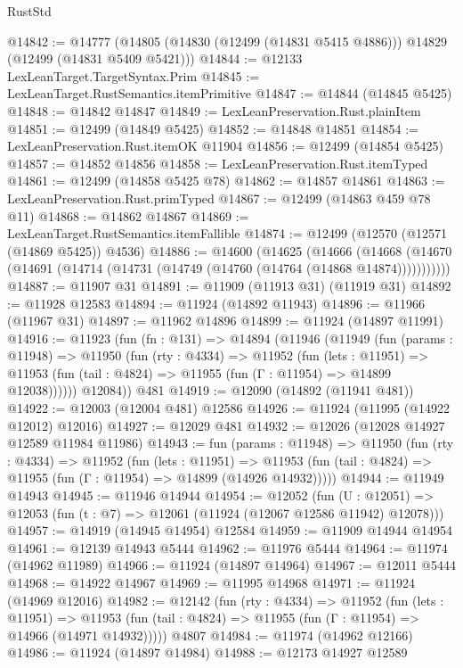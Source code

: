 \begin{lexlean}{RustStd}
\begin{coremodule}
{\begin{coremodule}
{{{{{{{{{{{{{{{{{{{{{{{{{{{{{{{{{{{{{{{{{{{{{{{{{{{{{{{{{{{{{{{{{{{{{{{{{{{{{{{{@14842 := @14777
    (@14805 (@14830 (@12499 (@14831 @5415 @4886))) @14829 (@12499 (@14831 @5409 @5421)))
@14844 := @12133 LexLeanTarget.TargetSyntax.Prim
@14845 := LexLeanTarget.RustSemantics.itemPrimitive
@14847 := @14844 (@14845 @5425)
@14848 := @14842 @14847
@14849 := LexLeanPreservation.Rust.plainItem
@14851 := @12499 (@14849 @5425)
@14852 := @14848 @14851
@14854 := LexLeanPreservation.Rust.itemOK @11904
@14856 := @12499 (@14854 @5425)
@14857 := @14852 @14856
@14858 := LexLeanPreservation.Rust.itemTyped
@14861 := @12499 (@14858 @5425 @78)
@14862 := @14857 @14861
@14863 := LexLeanPreservation.Rust.primTyped
@14867 := @12499 (@14863 @459 @78 @11)
@14868 := @14862 @14867
@14869 := LexLeanTarget.RustSemantics.itemFallible
@14874 := @12499 (@12570 (@12571 (@14869 @5425)) @4536)
@14886 := @14600
    (@14625
      (@14666
        (@14668 (@14670 (@14691 (@14714 (@14731 (@14749 (@14760 (@14764 (@14868 @14874)))))))))))
@14887 := @11907 @31
@14891 := @11909 (@11913 @31) (@11919 @31)
@14892 := @11928 @12583
@14894 := @11924 (@14892 @11943)
@14896 := @11966 (@11967 @31)
@14897 := @11962 @14896
@14899 := @11924 (@14897 @11991)
@14916 := @11923
    (fun (fn : @131) =>
    @14894
      (@11946
        (@11949
          (fun (params : @11948) =>
          @11950
            (fun (rty : @4334) =>
            @11952
              (fun (lets : @11951) =>
              @11953 (fun (tail : @4824) => @11955 (fun (Γ : @11954) => @14899 @12038))))))
        @12084))
    @481
@14919 := @12090 (@14892 (@11941 @481))
@14922 := @12003 (@12004 @481) @12586
@14926 := @11924 (@11995 (@14922 @12012) @12016)
@14927 := @12029 @481
@14932 := @12026 (@12028 @14927 @12589 @11984 @11986)
@14943 := fun (params : @11948) =>
  @11950
    (fun (rty : @4334) =>
    @11952
      (fun (lets : @11951) =>
      @11953 (fun (tail : @4824) => @11955 (fun (Γ : @11954) => @14899 (@14926 @14932)))))
@14944 := @11949 @14943
@14945 := @11946 @14944
@14954 := @12052
    (fun (U : @12051) => @12053 (fun (t : @7) => @12061 (@11924 (@12067 @12586 @11942) @12078)))
@14957 := @14919 (@14945 @14954) @12584
@14959 := @11909 @14944 @14954
@14961 := @12139 @14943 @5444
@14962 := @11976 @5444
@14964 := @11974 (@14962 @11989)
@14966 := @11924 (@14897 @14964)
@14967 := @12011 @5444
@14968 := @14922 @14967
@14969 := @11995 @14968
@14971 := @11924 (@14969 @12016)
@14982 := @12142
    (fun (rty : @4334) =>
    @11952
      (fun (lets : @11951) =>
      @11953 (fun (tail : @4824) => @11955 (fun (Γ : @11954) => @14966 (@14971 @14932)))))
    @4807
@14984 := @11974 (@14962 @12166)
@14986 := @11924 (@14897 @14984)
@14988 := @12173 @14927 @12589
}}}}}}}}}}}}}}}}}}}}}}}}}}}}}}}}}}}}}}}}}}}}}}}}}}}}}}}}}}}}}}}}}}}}}}}}}}}}}}}}
\end{coremodule}}
\end{coremodule}
\end{lexlean}
